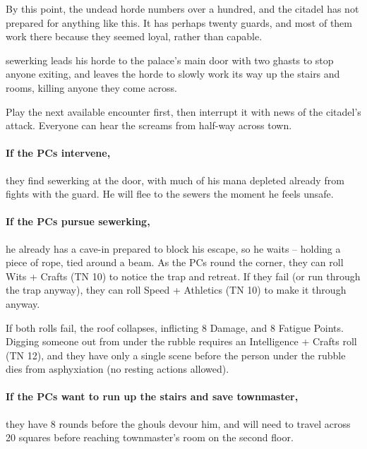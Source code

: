 \begin{multicols}{2}
By this point, the undead horde numbers over a hundred, and the citadel has not prepared for anything like this.
It has perhaps twenty guards, and most of them work there because they seemed loyal, rather than capable.

\Gls{sewerking} leads his horde to the palace's main door with two ghasts to stop anyone exiting, and leaves the horde to slowly work its way up the stairs and rooms, killing anyone they come across.

Play the next available encounter first, then interrupt it with news of the citadel's attack.
Everyone can hear the screams from half-way across \gls{town}.

\paragraph{If the PCs intervene,}
they find \gls{sewerking} at the door, with much of his mana depleted already from fights with the guard.
He will flee to the sewers the moment he feels unsafe.

\ghast

\ghast

\sewerking


\paragraph{If the PCs pursue \gls{sewerking},}
he already has a cave-in prepared to block his escape, so he waits -- holding a piece of rope, tied around a beam.
As the PCs round the corner, they can roll Wits + Crafts (TN 10) to notice the trap and retreat.
If they fail (or run through the trap anyway), they can roll Speed + Athletics (TN 10) to make it through anyway.

If both rolls fail, the roof collapses, inflicting 8 Damage, and 8 Fatigue Points.
Digging someone out from under the rubble requires an Intelligence + Crafts roll (TN 12), and they have only a single scene before the person under the rubble dies from asphyxiation (no resting actions allowed).

\paragraph{If the PCs want to run up the stairs and save \gls{townmaster},}
they have 8 rounds before the ghouls devour him, and will need to travel across 20 squares before reaching \gls{townmaster}'s room on the second floor.


\end{multicols}
